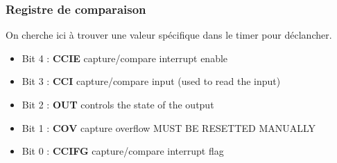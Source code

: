 \documentclass[../main.tex]{subfiles}
\begin{document}
\subsubsection{Registre de comparaison}
On cherche ici à trouver une valeur spécifique dans le timer pour déclancher.\\

\begin{itemize}
    \item Bit 4 : \textbf{CCIE} capture/compare interrupt enable\\
    \item Bit 3 : \textbf{CCI} capture/compare input (used to read the input)\\
    \item Bit 2 : \textbf{OUT} controls the state of the output\\
    \item Bit 1 : \textbf{COV} capture overflow \warning MUST BE RESETTED MANUALLY\\
    \item Bit 0 : \textbf{CCIFG} capture/compare interrupt flag\\
\end{itemize}
\end{document}
